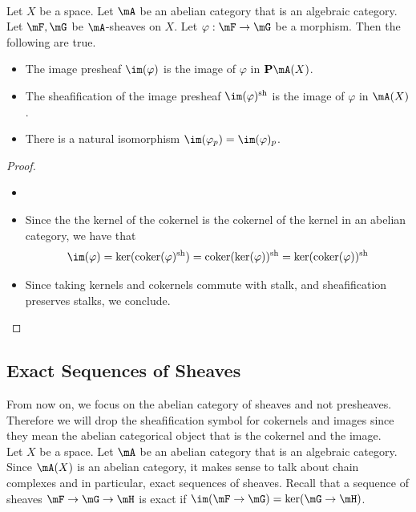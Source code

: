 \documentclass[a4paper]{article}
\begin{document}
\begin{prp}{}{}\\
Let $X$ be a space. Let $\mA$ be an abelian category that is an algebraic category. Let $\mF,\mG$ be $\mA$-sheaves on $X$. Let $\varphi:\mF\to\mG$ be a morphism. Then the following are true. 
\begin{itemize}
\item The image presheaf $\im(\varphi)$ is the image of $\varphi$ in $\bold{P}\mA(X)$. 
\item The sheafification of the image presheaf $\im(\varphi)^\text{sh}$ is the image of $\varphi$ in $\mA(X)$. 
\item There is a natural isomorphism $\im(\varphi_p)=\im(\varphi)_p$. 
\end{itemize}
\begin{proof}
\begin{itemize}
\item
\item Since the the kernel of the cokernel is the cokernel of the kernel in an abelian category, we have that $$\im(\varphi)=\ker(\text{coker}(\varphi)^\text{sh})=\text{coker}(\ker(\varphi))^\text{sh}=\ker(\text{coker}(\varphi))^\text{sh}$$
\item Since taking kernels and cokernels commute with stalk, and sheafification preserves stalks, we conclude. 
\end{itemize}
\end{proof}
\end{prp}

\subsection{Exact Sequences of Sheaves}
From now on, we focus on the abelian category of sheaves and not presheaves. Therefore we will drop the sheafification symbol for cokernels and images since they mean the abelian categorical object that is the cokernel and the image. \\

Let $X$ be a space. Let $\mA$ be an abelian category that is an algebraic category. Since $\mA(X)$ is an abelian category, it makes sense to talk about chain complexes and in particular, exact sequences of sheaves. Recall that a sequence of sheaves $\mF\to\mG\to\mH$ is exact if $\im(\mF\to\mG)=\ker(\mG\to\mH)$. 
\end{document}
